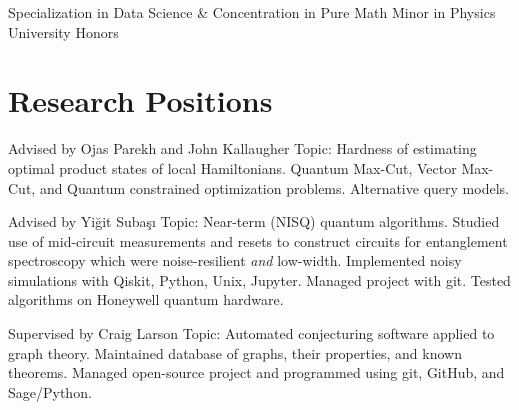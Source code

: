 \documentclass[11pt,letterpaper,serif]{moderncv}
\begin{document}
{}{}

\smallskip

\vspace{-\parsep}
{
	\begin{adjustwidth}{.25in}{}
		Specialization in Data Science \&
		Concentration in Pure Math \newline
		Minor in Physics \newline
		University Honors
	\end{adjustwidth}
}

%
\section{Research Positions}
{
	\begin{adjustwidth}{.25in}{}
		Advised by Ojas Parekh and John Kallaugher \newline
		Topic: Hardness of estimating optimal product states of local Hamiltonians. Quantum Max-Cut, Vector Max-Cut, and Quantum constrained optimization problems.
		Alternative query models.
	\end{adjustwidth}
}

{
	\begin{adjustwidth}{.25in}{}
		Advised by Yi\u{g}it Suba\c{s}\i \newline
		Topic: Near-term (NISQ) quantum algorithms. Studied use of mid-circuit measurements and resets to construct circuits for entanglement spectroscopy which were noise-resilient \textit{and} low-width. \newline
		Implemented noisy simulations with Qiskit, Python, Unix, Jupyter. Managed project with git. Tested algorithms on Honeywell quantum hardware.
	\end{adjustwidth}
}

{
	\begin{adjustwidth}{.25in}{}
		Supervised by Craig Larson \newline
		Topic: Automated conjecturing software applied to graph theory.\newline
		Maintained database of graphs, their properties, and known theorems. Managed open-source project and programmed using git, GitHub, and Sage/Python.
	\end{adjustwidth}
}
\end{document}
